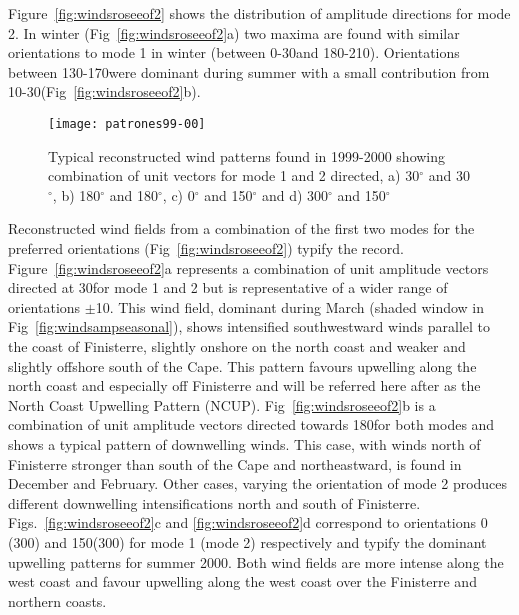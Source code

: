 Figure~\ref{fig:windsroseeof2} shows the distribution of amplitude
directions for mode 2. In winter ({Fig~\ref{fig:windsroseeof2}}a)
two maxima are found with similar orientations to mode 1 in winter
(between 0-30\deg and 180-210\deg). Orientations between
130-170\deg were dominant during summer with a small contribution
from 10-30\deg (Fig~\ref{fig:windsroseeof2}b).
\begin{figure}
\texttt{[image: patrones99-00]}
\caption{Typical reconstructed wind patterns found in 1999-2000
showing combination of unit vectors for mode 1 and 2 directed, a)
30$^\circ$ and 30$^\circ$, b) 180$^\circ$ and 180$^\circ$, c)
0$^\circ$ and 150$^\circ$ and d) 300$^\circ$ and 150$^\circ$}
\label{fig:windsreconfig}
\end{figure}

Reconstructed wind fields from a combination of the first two
modes for the preferred orientations
({Fig~\ref{fig:windsroseeof2}}) typify the record.
Figure~\ref{fig:windsroseeof2}a represents a combination of unit
amplitude vectors directed at 30\deg for mode 1 and 2 but is
representative of a wider range of orientations $\pm$10\deg. This
wind field, dominant during March (shaded window in
Fig~\ref{fig:windsampseasonal}), shows intensified southwestward
winds parallel to the coast of Finisterre, slightly onshore on the
north coast and weaker and slightly offshore south of the Cape.
This pattern favours upwelling along the north coast and
especially off Finisterre and will be referred here after as the
North Coast Upwelling Pattern (NCUP). Fig~\ref{fig:windsroseeof2}b
is a combination of unit amplitude vectors directed towards
180\deg for both modes and shows a typical pattern of downwelling
winds. This case, with winds north of Finisterre stronger than
south of the Cape and northeastward, is found in December and
February. Other cases, varying the orientation of mode 2 produces
different downwelling intensifications north and south of
Finisterre. Figs.~\ref{fig:windsroseeof2}c and
\ref{fig:windsroseeof2}d correspond to orientations 0\deg
(300\deg) and 150\deg (300\deg) for mode 1 (mode 2) respectively
and typify the dominant upwelling patterns for summer 2000. Both
wind fields are more intense along the west coast and favour
upwelling along the west coast over the Finisterre and northern
coasts.

